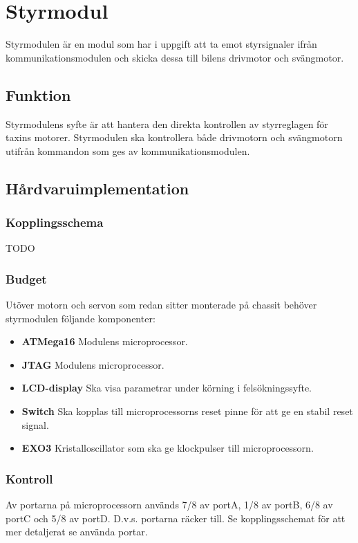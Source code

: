 \documentclass[designspec/spec.tex]{subfiles}
\begin{document}
\section{Styrmodul}
Styrmodulen är en modul som har i uppgift att ta emot styrsignaler ifrån
kommunikationsmodulen och skicka dessa till bilens drivmotor och svängmotor.

\subsection{Funktion}
Styrmodulens syfte är att hantera den direkta kontrollen av styrreglagen för
taxins motorer. Styrmodulen ska kontrollera både drivmotorn och svängmotorn
utifrån kommandon som ges av kommunikationsmodulen.

\subsection{Hårdvaruimplementation}

\subsubsection{Kopplingsschema}
TODO
\subsubsection{Budget}
Utöver motorn och servon som redan sitter monterade på chassit behöver
styrmodulen följande komponenter:

\begin{itemize}
	\item \textbf{ATMega16} Modulens microprocessor. 

	\item \textbf{JTAG} Modulens microprocessor. 
	\item \textbf{LCD-display} Ska visa parametrar under körning i
	felsökningssyfte.
	\item \textbf{Switch} Ska kopplas till microprocessorns reset pinne för att
	ge en stabil reset signal.
	\item \textbf{EXO3} Kristalloscillator som ska ge klockpulser till
	microprocessorn.
\end{itemize}

\subsubsection{Kontroll}
Av portarna på microprocessorn används 7/8 av portA, 1/8 av portB, 6/8 av portC
och 5/8 av portD. D.v.s. portarna räcker till.
Se kopplingsschemat för att mer detaljerat se använda portar.
\end{document}
